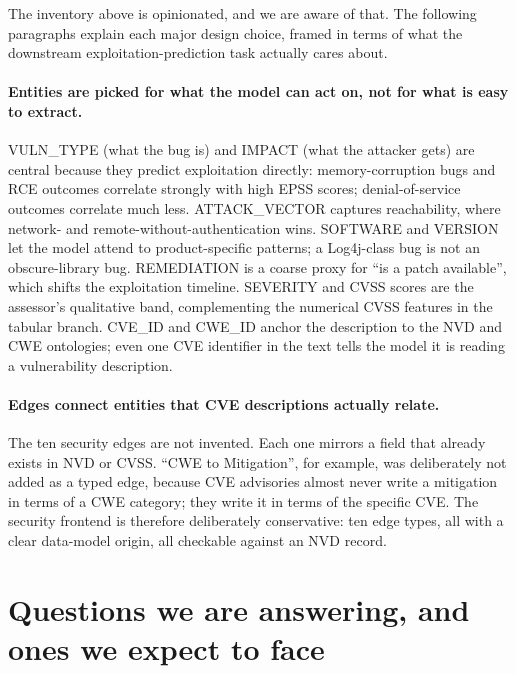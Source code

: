 \documentclass[11pt,a4paper]{article}
\begin{document}
The inventory above is opinionated, and we are aware of
that. The following paragraphs explain each major design
choice, framed in terms of what the downstream
exploitation-prediction task actually cares about.

\paragraph{Entities are picked for what the model can act
on, not for what is easy to extract.}
VULN\_TYPE (what the bug is) and IMPACT (what the attacker
gets) are central because they predict exploitation
directly: memory-corruption bugs and RCE outcomes correlate
strongly with high EPSS scores; denial-of-service outcomes
correlate much less. ATTACK\_VECTOR captures reachability,
where network- and remote-without-authentication wins.
SOFTWARE and VERSION let the model attend to
product-specific patterns; a Log4j-class bug is not an
obscure-library bug. REMEDIATION is a coarse proxy for
``is a patch available'', which shifts the exploitation
timeline. SEVERITY and CVSS scores are the assessor's
qualitative band, complementing the numerical CVSS features
in the tabular branch. CVE\_ID and CWE\_ID anchor the
description to the NVD and CWE ontologies; even one CVE
identifier in the text tells the model it is reading a
vulnerability description.

\paragraph{Edges connect entities that CVE descriptions
actually relate.}
The ten security edges are not invented. Each one mirrors
a field that already exists in NVD or CVSS. ``CWE to
Mitigation'', for example, was deliberately not added as a
typed edge, because CVE advisories almost never write a
mitigation in terms of a CWE category; they write it in
terms of the specific CVE. The security frontend is
therefore deliberately conservative: ten edge types, all
with a clear data-model origin, all checkable against an
NVD record.

\section{Questions we are answering, and ones we expect to face}
\label{sec:faq}
\end{document}
